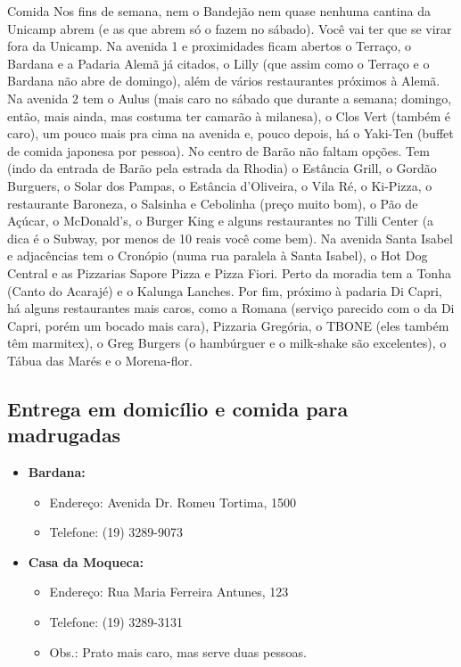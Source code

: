 \begin{story}{Comida}
Nos fins de semana, nem o Bandejão nem quase nenhuma cantina da Unicamp abrem (e as que abrem só o fazem no sábado). Você vai ter que se virar fora da Unicamp. Na avenida 1 e proximidades ficam abertos o Terraço, o Bardana e a Padaria Alemã já citados, o Lilly (que assim como o Terraço e o Bardana não abre de domingo), além de vários restaurantes próximos à Alemã. Na avenida 2 tem o Aulus (mais caro no sábado que durante a semana; domingo, então, mais ainda, mas costuma ter camarão à milanesa), o Clos Vert (também é caro), um pouco mais pra cima na avenida e, pouco depois, há o Yaki-Ten (buffet de comida japonesa por pessoa). No centro de Barão não faltam opções. Tem (indo da entrada de Barão pela estrada da Rhodia) o Estância Grill, o Gordão Burguers, o Solar dos Pampas, o Estância d’Oliveira, o Vila Ré, o Ki-Pizza, o restaurante Baroneza, o Salsinha e Cebolinha (preço muito bom), o Pão de Açúcar, o McDonald’s, o Burger King e alguns restaurantes no Tilli Center (a dica é o Subway, por menos de 10 reais você come bem). Na avenida Santa Isabel e adjacências tem o Cronópio (numa rua paralela à Santa Isabel), o Hot Dog Central e as Pizzarias Sapore Pizza e Pizza Fiori. Perto da moradia tem a Tonha (Canto do Acarajé) e o Kalunga Lanches. Por fim, próximo à padaria Di Capri, há alguns restaurantes mais caros, como a Romana (serviço parecido com o da Di Capri, porém um bocado mais cara), Pizzaria Gregória, o TBONE (eles também têm marmitex), o Greg Burgers (o hambúrguer e o milk-shake são excelentes), o Tábua das Marés e o Morena-flor.

\subsection*{Entrega em domicílio e comida para madrugadas}

\begin{itemize}

\item \textbf{Bardana:}
\begin{itemize}
\item Endereço: Avenida Dr. Romeu Tortima, 1500
\item Telefone: (19) 3289-9073
\end{itemize}

\item \textbf{Casa da Moqueca:}
\begin{itemize}
\item Endereço: Rua Maria Ferreira Antunes, 123
\item Telefone: (19) 3289-3131
\item Obs.: Prato mais caro, mas serve duas pessoas.
\end{itemize}


\end{itemize}
\end{story}
